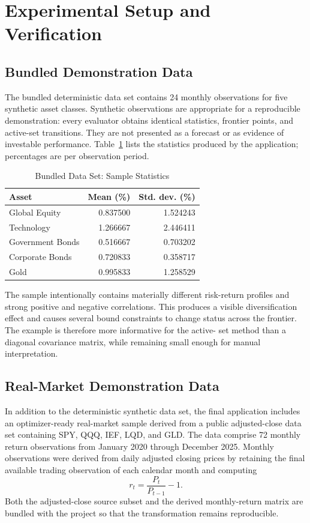 \documentclass[conference]{IEEEtran}
\begin{document}
\section{Experimental Setup and Verification}

\subsection{Bundled Demonstration Data}

The bundled deterministic data set contains 24 monthly observations for five
synthetic asset classes. Synthetic observations are appropriate for a
reproducible demonstration: every evaluator obtains identical statistics,
frontier points, and active-set transitions. They are not presented as a
forecast or as evidence of investable performance. Table~\ref{tab:stats}
lists the statistics produced by the application; percentages are per
observation period.

\begin{table}[!t]
\caption{Bundled Data Set: Sample Statistics}
\label{tab:stats}
\centering
\footnotesize
\begin{tabular}{lrr}
\toprule
Asset & Mean (\%) & Std. dev. (\%)\\
\midrule
Global Equity    & 0.837500 & 1.524243\\
Technology       & 1.266667 & 2.446411\\
Government Bonds & 0.516667 & 0.703202\\
Corporate Bonds  & 0.720833 & 0.358717\\
Gold             & 0.995833 & 1.258529\\
\bottomrule
\end{tabular}
\end{table}

The sample intentionally contains materially different risk-return profiles
and strong positive and negative correlations. This produces a visible
diversification effect and causes several bound constraints to change status
across the frontier. The example is therefore more informative for the active-
set method than a diagonal covariance matrix, while remaining small enough for
manual interpretation.

\subsection{Real-Market Demonstration Data}

In addition to the deterministic synthetic data set, the final application
includes an optimizer-ready real-market sample derived from a public
adjusted-close data set \cite{marketdata} containing SPY, QQQ, IEF, LQD,
and GLD. The data comprise 72 monthly return observations from January 2020
through December 2025. Monthly observations were derived from daily adjusted
closing prices by retaining the final available trading observation of each
calendar month and computing
\begin{equation}
    r_t = \frac{P_t}{P_{t-1}} - 1.
    \label{eq:market-return}
\end{equation}
Both the adjusted-close source subset and the derived monthly-return matrix are
bundled with the project so that the transformation remains reproducible.
\end{document}
